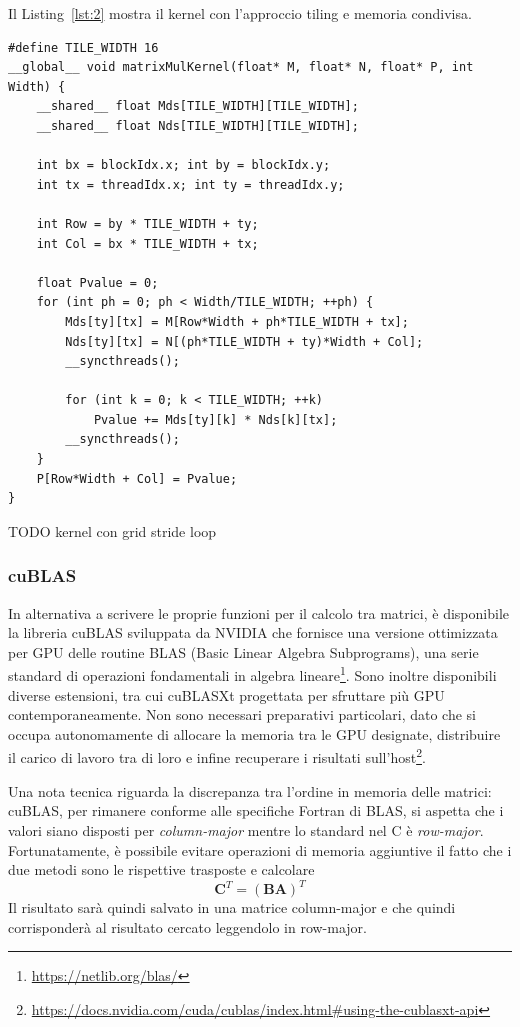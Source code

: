 \documentclass[a4paper]{article}
\begin{document}
Il Listing~\ref{lst:2} mostra il kernel con l'approccio tiling e memoria condivisa.

\begin{lstlisting}[caption={Kernel CUDA con tiling e memoria condivisa}, label={lst:2}]
#define TILE_WIDTH 16
__global__ void matrixMulKernel(float* M, float* N, float* P, int Width) {
    __shared__ float Mds[TILE_WIDTH][TILE_WIDTH];
    __shared__ float Nds[TILE_WIDTH][TILE_WIDTH];

    int bx = blockIdx.x; int by = blockIdx.y;
    int tx = threadIdx.x; int ty = threadIdx.y;

    int Row = by * TILE_WIDTH + ty;
    int Col = bx * TILE_WIDTH + tx;

    float Pvalue = 0;
    for (int ph = 0; ph < Width/TILE_WIDTH; ++ph) {
        Mds[ty][tx] = M[Row*Width + ph*TILE_WIDTH + tx];
        Nds[ty][tx] = N[(ph*TILE_WIDTH + ty)*Width + Col];
        __syncthreads();

        for (int k = 0; k < TILE_WIDTH; ++k)
            Pvalue += Mds[ty][k] * Nds[k][tx];
        __syncthreads();
    }
    P[Row*Width + Col] = Pvalue;
}
\end{lstlisting}

TODO kernel con grid stride loop

\subsubsection{cuBLAS}
In alternativa a scrivere le proprie funzioni per il calcolo tra matrici, è disponibile la libreria cuBLAS sviluppata da NVIDIA che fornisce una versione ottimizzata per GPU delle routine BLAS (Basic Linear Algebra Subprograms), una serie standard di operazioni fondamentali in algebra lineare\footnote{\url{https://netlib.org/blas/}}. Sono inoltre disponibili diverse estensioni, tra cui cuBLASXt progettata per sfruttare più GPU contemporaneamente. Non sono necessari preparativi particolari, dato che si occupa autonomamente di allocare la memoria tra le GPU designate, distribuire il carico di lavoro tra di loro e infine recuperare i risultati sull'host\footnote{\url{https://docs.nvidia.com/cuda/cublas/index.html\#using-the-cublasxt-api}}.

Una nota tecnica riguarda la discrepanza tra l'ordine in memoria delle matrici: cuBLAS, per rimanere conforme alle specifiche Fortran di BLAS, si aspetta che i valori siano disposti per \textit{column-major} mentre lo standard nel C è \textit{row-major}. Fortunatamente, è possibile evitare operazioni di memoria aggiuntive il fatto che i due metodi sono le rispettive trasposte e calcolare
$$
    \mathbf{C}^T=(\mathbf{B}\mathbf{A})^T
$$
Il risultato sarà quindi salvato in una matrice column-major e che quindi corrisponderà al risultato cercato leggendolo in row-major.
\end{document}
